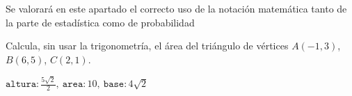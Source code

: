 \documentclass[addpoints,spanish, 12pt,a4paper]{exam}
\begin{document}
\begin{questions}

\question[1] Se valorará en este apartado el correcto uso de la notación matemática tanto de la parte de estadística como de probabilidad




\question[2] Calcula, sin usar la trigonometría, el área del triángulo de vértices $A\left(-1, 3\right)$, $B\left(6, 5\right)$, $C\left(2, 1\right)$.
\begin{solution}
$\mathtt{\text{altura}} : \frac{5 \sqrt{2}}{2}, \  \mathtt{\text{area}} : 10, \  \mathtt{\text{base}} : 4 \sqrt{2}$
\end{solution}




\end{questions}
\end{document}
